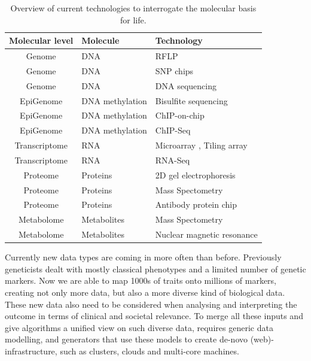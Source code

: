 \begin{table}[h]
  \centering
  {\footnotesize
  \begin{tabular}{ | c | l | l | }
    \hline
    {\bf Molecular level} & {\bf Molecule} & {\bf Technology}\\
    \hline
    \hline
\rowcolor{gray!35}    Genome          & DNA                & RFLP \cite{Lander:1986} \\
\rowcolor{gray!35}    Genome          & DNA                & SNP chips \cite{Hacia:1999} \\
\rowcolor{gray!35}    Genome          & DNA                & DNA sequencing \cite{Mardis:2008} \\
    \hline
    EpiGenome       & DNA methylation    & Bisulfite sequencing \cite{Hayatsu:2007} \\
    EpiGenome       & DNA methylation    & ChIP-on-chip \cite{Collas:2010} \\
    EpiGenome       & DNA methylation    & ChIP-Seq \cite{Park:2009} \\
    \hline
    \hline
\rowcolor{gray!35}    Transcriptome   & RNA          & Microarray \cite{Lashkari:1997}, Tiling array \cite{Lee:2013} \\
\rowcolor{gray!35}    Transcriptome   & RNA          & RNA-Seq \cite{Wang:2009}\\
    \hline
    Proteome        & Proteins     & 2D gel electrophoresis \cite{O'Farrell:1975}\\
    Proteome        & Proteins     & Mass Spectometry \cite{Deshaies:2001}\\
    Proteome        & Proteins     & Antibody protein chip \cite{Fasolo:2009} \\
    \hline
\rowcolor{gray!35}    Metabolome      & Metabolites  & Mass Spectometry \cite{Aebersold:2003} \\
\rowcolor{gray!35}    Metabolome      & Metabolites  & Nuclear magnetic resonance \cite{Espina:2009} \\
    \hline
  \end{tabular}
  }
  \caption[Overview]{Overview of current technologies to interrogate the molecular basis for life.}
    \label{tbl:overview}
\end{table}

Currently new data types are coming in more often than before. Previously geneticists dealt with mostly 
classical phenotypes and a limited number of genetic markers. Now we are able to map 1000s of traits onto 
millions of markers, creating not only more data, but also a more diverse kind of biological data. These 
new data also need to be considered when analysing and interpreting the outcome in terms of clinical and 
societal relevance. To merge all these inputs and give algorithms a unified view on such diverse data, 
requires generic data modelling, and generators that use these models to create de-novo (web)-infrastructure, 
such as clusters, clouds and multi-core machines. 

